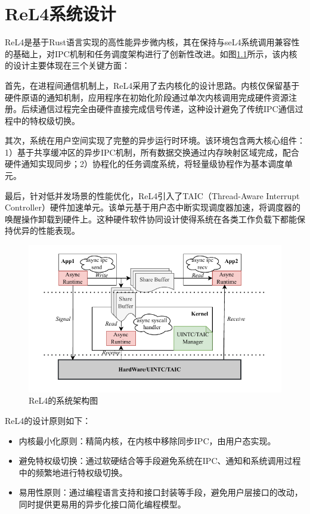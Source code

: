 \chapter{ReL4系统设计}
\label{chap:ReL4_intro}
ReL4是基于Rust语言实现的高性能异步微内核，其在保持与seL4系统调用兼容性的基础上，对IPC机制和任务调度架构进行了创新性改进。如图\ref{fig:ReL4_framework}所示，该内核的设计主要体现在三个关键方面：

首先，在进程间通信机制上，ReL4采用了去内核化的设计思路。内核仅保留基于硬件原语的通知机制，应用程序在初始化阶段通过单次内核调用完成硬件资源注册。后续通信过程完全由硬件直接完成信号传递，这种设计避免了传统IPC通信过程中的特权级切换。

其次，系统在用户空间实现了完整的异步运行时环境。该环境包含两大核心组件：1）基于共享缓冲区的异步IPC机制，所有数据交换通过内存映射区域完成，配合硬件通知实现同步；2）协程化的任务调度系统，将轻量级协程作为基本调度单元。

最后，针对低并发场景的性能优化，ReL4引入了TAIC（Thread-Aware Interrupt Controller）硬件加速单元。该单元基于用户态中断实现调度器加速，将调度器的唤醒操作卸载到硬件上。这种硬件软件协同设计使得系统在各类工作负载下都能保持优异的性能表现。
\begin{figure}[htbp]
  \centering
  \includegraphics{figures/ReL4_framework.drawio.pdf}
  \caption{ReL4的系统架构图}\label{fig:ReL4_framework}
\end{figure}

ReL4的设计原则如下：
\begin{itemize}
  \item 内核最小化原则：精简内核，在内核中移除同步IPC，由用户态实现。
  \item 避免特权级切换：通过软硬结合等手段避免系统在IPC、通知和系统调用过程中的频繁地进行特权级切换。
  \item 易用性原则：通过编程语言支持和接口封装等手段，避免用户层接口的改动，同时提供更易用的异步化接口简化编程模型。
\end{itemize}

